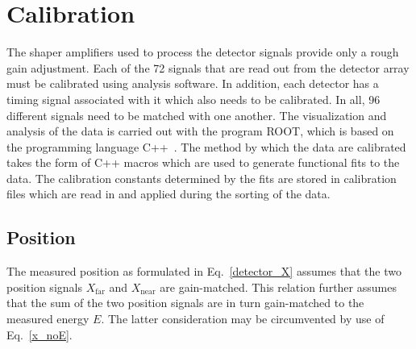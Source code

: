 \chapter{Calibration}
\label{calib}
The shaper amplifiers used to process the detector signals provide only a rough gain adjustment.  Each of the 72 signals that are read out from the detector array must be calibrated using analysis software.  In addition, each detector has a timing signal associated with it which also needs to be calibrated.  
In all, 96 different signals need to be matched with one another.  The visualization and analysis of the data is carried out with the program ROOT, which is based on the programming language C++~\cite{Brun_1998}.  The method by which the data are calibrated takes the form of C++ macros which are used to generate functional fits to the data.  The calibration constants determined by the fits are stored in calibration files which are read in and applied during the sorting of the data.
\section{Position}
The measured position as formulated in Eq.~\ref{detector_X} assumes that the two position signals $X_\mathrm{far}$ and $X_\mathrm{near}$ are gain-matched.  This relation further assumes that the sum of the two position signals are in turn gain-matched to the measured energy $E$.  The latter consideration may be circumvented by use of Eq.~\ref{x_noE}. %
